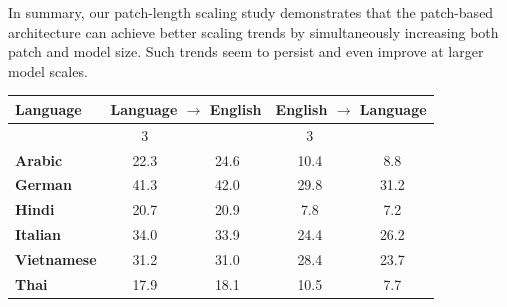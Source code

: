 \documentclass[]{fairmeta}
\begin{document}
In summary, our patch-length scaling study demonstrates that the \model{} patch-based architecture can achieve better scaling trends by simultaneously increasing both patch and model size. Such trends seem to persist and even improve at larger model scales.

\begin{table}[t]
\centering
\begin{tabular}{@{}lcccc@{}}
\toprule

 Language & \multicolumn{2}{c}{Language $\rightarrow$ English} & \multicolumn{2}{c}{English $\rightarrow$ Language} \\ 
\midrule
& \llama{} 3 & \model{} & \llama{} 3 & \model{} \\
 \midrule
 \textbf{Arabic} & 22.3 & 24.6 & 10.4  & 8.8 \\
 \textbf{German} & 41.3 & 42.0 & 29.8  & 31.2  \\
 \textbf{Hindi} & 20.7 & 20.9 & 7.8  & 7.2 \\ 
 \textbf{Italian} &  34.0  & 33.9 & 24.4 & 26.2 \\ 
 \textbf{Vietnamese} & 31.2  & 31.0 & 28.4 & 23.7 \\
 \textbf{Thai} &  17.9  & 18.1 & 10.5 & 7.7 \\
 
\midrule


\end{tabular}
\end{table}
\end{document}
